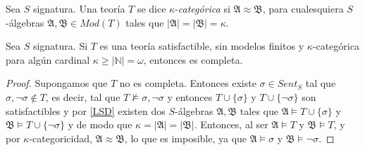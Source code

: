 \begin{definition}
Sea $S$ signatura. Una teoría $T$ se dice $\kappa$-\textit{categórica} si $\mathfrak{A} \approx \mathfrak{B}$,  para cualesquiera $S$-álgebras $\mathfrak{A}, \mathfrak{B} \in Mod(T)$ tales que $|\mathfrak{A}|= |\mathfrak{B}| = \kappa$.
\end{definition}

\begin{theorem}
Sea $S$ signatura. Si $T$ es una teoría satisfactible, sin modelos finitos y $\kappa$-categórica para algún cardinal $\kappa \geq|\mathbb{N}|=\omega$, entonces es completa.
\end{theorem}
\begin{proof}
Supongamos que $T$ no es completa. Entonces existe $\sigma \in Sent_S$ tal que $\sigma, \neg\sigma \notin T$, es decir, tal que $T \nvDash \sigma, \neg\sigma$ y entonces $T\cup\{\sigma\}$ y $T\cup\{\neg\sigma\}$ son satisfactibles y por \ref{LSD} existen dos $S$-álgebras $\mathfrak{A}, \mathfrak{B}$ tales que $\mathfrak{A}\vDash T\cup \{\sigma\}$ y $\mathfrak{B}\vDash T\cup\{\neg\sigma\}$ y de modo que $\kappa = |\mathfrak{A}| = |\mathfrak{B}|$. Entonces, al ser $\mathfrak{A} \vDash T$ y $\mathfrak{B} \vDash T$, y por $\kappa$-categoricidad, $\mathfrak{A} \approx \mathfrak{B}$, lo que es imposible, ya que $\mathfrak{A}\vDash \sigma$ y $\mathfrak{B}\vDash \neg\sigma$.
\end{proof}

